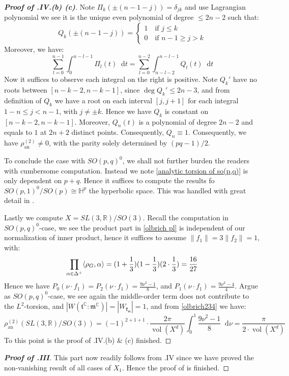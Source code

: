 \documentclass[11pt]{report}
\theoremstyle{definition}
\theoremstyle{plain}
\DeclareMathOperator{\vol}{vol}
\newcommand{\real}{\mathbb{R}}
\newcommand{\complex}{\mathbb{C}}
\newcommand{\brac}[1]{\langle #1 \rangle}
\newcommand{\norm}[1]{\lVert #1 \rVert}
\newcommand{\mass}[1]{\mathop{}\mathrm{d}{#1}}
\newcommand{\Lie}[1]{\mathfrak{#1}}
\begin{document}
\begin{proof}[\textbf{Proof of .IV.(b) (c)}]
Note $\Pi_k(\pm(n-1-j))=\delta_{jk}$ and use Lagrangian polynomial we see it is the unique even polynomial of degree $\leq 2n-2$ such that:
\begin{equation*}
Q_k(\pm (n-1-j))=\begin{cases}
1 \quad \text{if }j\leq k \\ 0 \quad \text{if }n-1\geq j> k
\end{cases}
\end{equation*}
Moreover, we have:
\begin{equation}
\sum_{l=0}^{n-1}\int_{0}^{n-l-1}\Pi_l(t)\mass{t}=\sum_{l=0}^{n-2}\int_{n-l-2}^{n-l-1}Q_l(t)\mass{t}
\end{equation}
Now it suffices to observe each integral on the right is positive. Note $Q_k'$ have no roots between $[n-k-2, n-k-1]$, since $\deg Q_k'\leq 2n-3$, and from definition of $Q_k$ we have a root on each interval $[j, j+1]$ for each integral $1-n\leq j<n-1$, with $j\neq \pm k$. Hence we have $Q_k$ is constant on $[n-k-2, n-k-1]$. Moreover, $Q_n(t)$ is a polynomial of degree $2n-2$ and equals to $1$ at $2n+2$ distinct points. Consequently, $Q_n\equiv 1$. Consequently, we have $\rho_{\mathrm{an}}^{(2)}\neq 0$, with the parity solely determined by $(pq-1)/2$.
\par To conclude the case with $SO(p,q)^0$, we shall not further burden the readers with cumbersome computation. Instead we note \ref{analytic torsion of so(p,q)} is only dependent on $p+q$. Hence it suffices to compute the results fo $SO(p,1)^0/SO(p)\cong \mathbb{H}^p$ the hyperbolic space. This was handled with great detail in \cite{schick1998}.
\par Lastly we compute $X=SL(3,\real)/SO(3)$. Recall the computation in $SO(p,q)^0$-case, we see the product part in \ref{olbrich pl} is independent of our normalization of inner product, hence it suffices to assume $\norm{f_1}=3\norm{f_2}=1$, with:
\begin{equation}
\prod_{\alpha\in \Delta^+}^{}\brac{\rho_G, \alpha}=(1+\frac{1}{3})(1-\frac{1}{3})(2\cdot\frac{1}{3})=\frac{16}{27}\\
\end{equation}
Hence we have $P_0(\nu\cdot f_1)=P_2(\nu\cdot f_1)=\frac{9\nu^2-1}{8}$, and $P_1(\nu\cdot f_1)=\frac{9\nu^2-4}{4}$. Argue as $SO(p,q)^0$-case, we see again the middle-order term does not contribute to the $L^2$-torsion, and $|W(\Lie{t}^\complex:\Lie{m}^\complex)|=|W_\Lie{k_m}|=1$, and from \ref{olbrich234} we have:
\begin{equation}
\rho^{(2)}_{\mathrm{an}}(SL(3,\real)/SO(3))=(-1)^{2+1+1}\cdot \frac{2\pi}{\vol(X^d)}\int^1_0\frac{9\nu^2-1}{8}\mass{\nu}=\frac{\pi}{2\cdot \vol(X^d)}
\end{equation}
To this point is the proof of .IV.(b) \& (c) finished.
\end{proof}
\begin{proof}[\textbf{Proof of .III}] This part now readily follows from .IV since we have proved the non-vanishing result of all cases of $X_1$. Hence the proof of  is finished.
\end{proof}

\appendix

 
\end{document}
